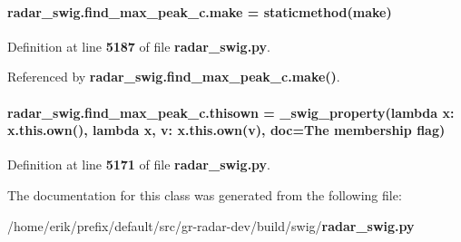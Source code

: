\paragraph[{make}]{\setlength{\rightskip}{0pt plus 5cm}radar\+\_\+swig.\+find\+\_\+max\+\_\+peak\+\_\+c.\+make = staticmethod(make)\hspace{0.3cm}{\ttfamily [static]}}\label{classradar__swig_1_1find__max__peak__c_a330299b5ca359720bb5c31c116db2476}


Definition at line {\bf 5187} of file {\bf radar\+\_\+swig.\+py}.



Referenced by {\bf radar\+\_\+swig.\+find\+\_\+max\+\_\+peak\+\_\+c.\+make()}.

\paragraph[{thisown}]{\setlength{\rightskip}{0pt plus 5cm}radar\+\_\+swig.\+find\+\_\+max\+\_\+peak\+\_\+c.\+thisown = {\bf \+\_\+swig\+\_\+property}(lambda x\+: x.\+this.\+own(), lambda {\bf x}, v\+: x.\+this.\+own(v), doc=\textquotesingle{}The membership flag\textquotesingle{})\hspace{0.3cm}{\ttfamily [static]}}\label{classradar__swig_1_1find__max__peak__c_a48d225847c49dfc58ca3848491e52100}


Definition at line {\bf 5171} of file {\bf radar\+\_\+swig.\+py}.



The documentation for this class was generated from the following file\+:\begin{DoxyCompactItemize}
\item 
/home/erik/prefix/default/src/gr-\/radar-\/dev/build/swig/{\bf radar\+\_\+swig.\+py}\end{DoxyCompactItemize}
